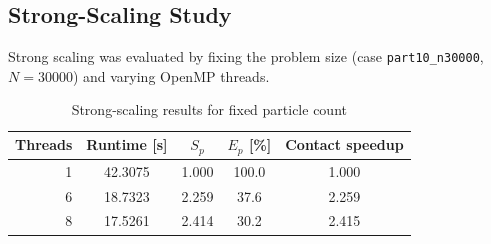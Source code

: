 \subsection{Strong-Scaling Study}
Strong scaling was evaluated by fixing the problem size (case \texttt{part10\_n30000}, $N=30000$) and varying OpenMP threads.
\begin{table}[!t]
\centering
\caption{Strong-scaling results for fixed particle count}
\label{tab:strong-scaling}
\begin{tabular}{rcccc}
\toprule
Threads & Runtime [s] & $S_p$ & $E_p$ [\%] & Contact speedup \\
\midrule
1 & 42.3075 & 1.000 & 100.0 & 1.000 \\
6 & 18.7323 & 2.259 & 37.6 & 2.259 \\
8 & 17.5261 & 2.414 & 30.2 & 2.415 \\
\bottomrule
\end{tabular}
\end{table}
